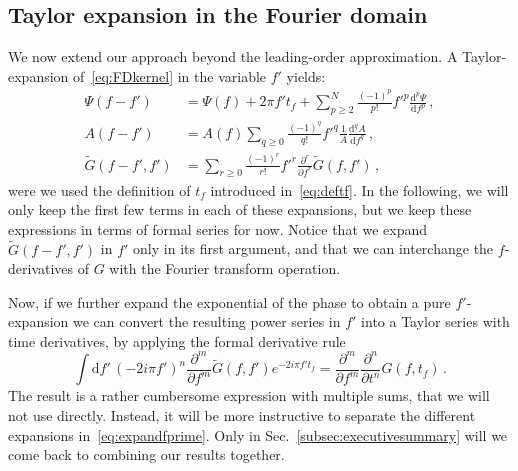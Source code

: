 \documentclass[aps,showpacs,twocolumn,
prd,superscriptaddress,nofootinbib]{revtex4-1}
\newcommand{\be}{\begin{equation}}
\newcommand{\ee}{\end{equation}}
\newcommand\ud{{\mathrm{d}}}
\newcommand{\tf}{t_{f}}
\begin{document}

\subsection{Taylor expansion in the Fourier domain}
\label{subsec:TaylorFD}

We now extend our approach beyond the leading-order approximation. A Taylor-expansion of~\eqref{eq:FDkernel} in the variable $f'$ yields:
\begin{subequations}\label{eq:expandfprime}
\begin{align}
	\Psi(f-f') &= \Psi(f) + 2\pi f' \tf + \sum\limits_{p\geq 2}^{N} \frac{(-1)^{p}}{p!} {f'}^{p} \frac{\ud^{p} \Psi}{\ud f^{p}} \,, \label{eq:expandPsi}\\
	A(f-f') &= A(f) \sum\limits_{q\geq 0} \frac{(-1)^{q}}{q!} {f'}^{q} \frac{1}{A}\frac{\ud^{q} A}{\ud f^{q}} \,, \label{eq:expandA}\\
	\tilde{G}(f-f', f') &= \sum\limits_{r\geq 0} \frac{(-1)^{r}}{r!} {f'}^{r} \frac{\partial^{r} }{\partial f^{r}}  \tilde{G}(f,f') \label{eq:expandG} \,,
\end{align}
\end{subequations}
were we used the definition of $t_{f}$ introduced in~\eqref{eq:deftf}. In the following, we will only keep the first few terms in each of these expansions, but we keep these expressions in terms of formal series for now. Notice that we expand $\tilde{G}(f-f',f')$ in $f'$ only in its first argument, and that we can interchange the $f$-derivatives of $G$ with the Fourier transform operation.

Now, if we further expand the exponential of the phase to obtain a pure $f'$-expansion we can convert the resulting power series in $f'$ into a Taylor series with time derivatives, by applying the formal derivative rule
\allowdisplaybreaks
\be
	\int \ud f'\, {(-2i\pi f')}^{n} \frac{\partial^{m}}{\partial f^{m}} \tilde{G}(f,f') e^{-2i\pi f' \tf} = \frac{\partial^{m} }{\partial f^{m}} \frac{\partial^{n} }{\partial t^{n}} G (f,\tf) \,.
\ee
The result is a rather cumbersome expression with multiple sums, that we will not use directly. Instead, it will be more instructive to separate the different expansions in~\eqref{eq:expandfprime}. Only in Sec.~\ref{subsec:executivesummary} will we come back to combining our results together.
\end{document}
